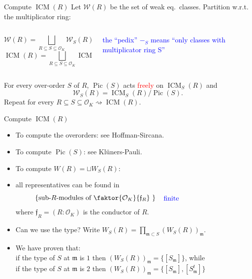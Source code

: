 \documentclass[usenames,dvipsnames,handout]{beamer}
\DeclareMathOperator{\ICM}{ICM}
\DeclareMathOperator{\Pic}{Pic}
\newcommand{\cO}{{\mathcal O}}
\newcommand{\cW}{{\mathcal W}}
\renewcommand{\frm}{{\mathfrak m}}
\newcommand{\frf}{{\mathfrak f}}
\newcommand{\set}[1]{\left\lbrace#1\right\rbrace }
\newcommand{\red}[1]{\textcolor{red}{#1}}
\begin{document}
\begin{frame}{ Compute $\ICM(R)$ }
    Let $\cW(R)$ be the set of weak eq.~classes. 
\pause 
    Partition w.r.t. the multiplicator ring:
    \begin{columns}
    \begin{column}{0.5\textwidth}
      \[ \cW(R) = \bigsqcup_{R\subseteq S \subseteq \cO_K} \cW_S(R)\]
      \[ \ICM(R) = \bigsqcup_{R\subseteq S \subseteq \cO_K} \ICM_S(R)\]
    \end{column}
\pause
    \begin{column}{0.5\textwidth}  %
    \begin{center}
    \textcolor{blue}{\parbox{10em}{the ``pedix'' $-_S$ means ``only classes with multiplicator ring S''}} 
    \end{center}
    \end{column}
    \end{columns}
\pause
    \begin{theorem}[M.] 
    For every over-order $S$ of $R$, $\Pic(S)$ acts \red{freely} on $\ICM_S(R)$ and
    \[ \cW_S(R) = \ICM_S(R) / \Pic(S). \]
\pause
    Repeat for every $R\subseteq S \subseteq \cO_K \rightsquigarrow \ICM(R)$.
    \end{theorem}
\end{frame}

\begin{frame}{ Compute $\ICM(R)$ }
    \begin{itemize}
    \item To compute the overorders: see Hoffman-Sircana.
\pause
    \item To compute $\Pic(S)$: see Klüners-Pauli.
\pause
    \item To compute $W(R) = \sqcup W_S(R)$:
\pause
    \item all representatives can be found in
        \[\set{\text{sub-$R$-modules of $\faktor{\cO_K}{\frf_R}$ }} \quad \textcolor{blue}{\parbox{10 em}{finite}}\]
        where $\frf_R=(R:\cO_K)$ is the conductor of $R$.
\pause
    \item Can we use the type? Write $W_S(R) = \prod_{\frm \subset S} (W_S(R))_\frm$.
\pause
    \item We have proven that:\\
        if the type of $S$ at $\frm$ is $1$ then $(W_S(R))_\frm = \{ [S_\frm] \}$, while \\
        if the type of $S$ at $\frm$ is $2$ then $(W_S(R))_\frm = \{ [S_\frm], [S^t_\frm] \}$
    \end{itemize}
\end{frame}
\end{document}

